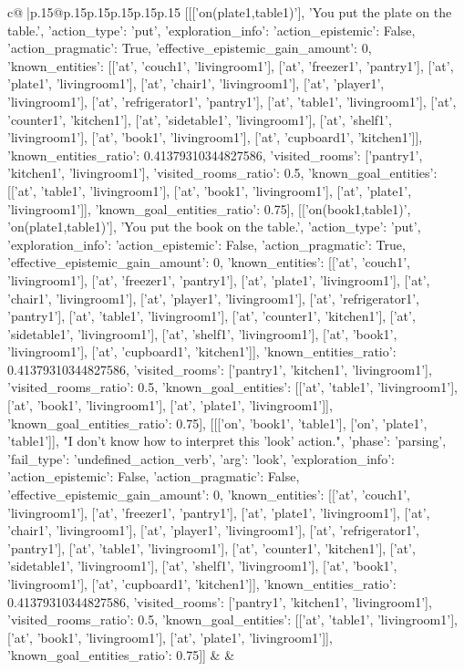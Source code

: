 \documentclass{article}
\begin{document}
{\begin{supertabular}{c@{$\;$}|p{.15\linewidth}@{}p{.15\linewidth}p{.15\linewidth}p{.15\linewidth}p{.15\linewidth}p{.15\linewidth}}
{{{	 [[['on(plate1,table1)'], 'You put the plate on the table.', {'action_type': 'put', 'exploration_info': {'action_epistemic': False, 'action_pragmatic': True, 'effective_epistemic_gain_amount': 0, 'known_entities': [['at', 'couch1', 'livingroom1'], ['at', 'freezer1', 'pantry1'], ['at', 'plate1', 'livingroom1'], ['at', 'chair1', 'livingroom1'], ['at', 'player1', 'livingroom1'], ['at', 'refrigerator1', 'pantry1'], ['at', 'table1', 'livingroom1'], ['at', 'counter1', 'kitchen1'], ['at', 'sidetable1', 'livingroom1'], ['at', 'shelf1', 'livingroom1'], ['at', 'book1', 'livingroom1'], ['at', 'cupboard1', 'kitchen1']], 'known_entities_ratio': 0.41379310344827586, 'visited_rooms': ['pantry1', 'kitchen1', 'livingroom1'], 'visited_rooms_ratio': 0.5, 'known_goal_entities': [['at', 'table1', 'livingroom1'], ['at', 'book1', 'livingroom1'], ['at', 'plate1', 'livingroom1']], 'known_goal_entities_ratio': 0.75}}], [['on(book1,table1)', 'on(plate1,table1)'], 'You put the book on the table.', {'action_type': 'put', 'exploration_info': {'action_epistemic': False, 'action_pragmatic': True, 'effective_epistemic_gain_amount': 0, 'known_entities': [['at', 'couch1', 'livingroom1'], ['at', 'freezer1', 'pantry1'], ['at', 'plate1', 'livingroom1'], ['at', 'chair1', 'livingroom1'], ['at', 'player1', 'livingroom1'], ['at', 'refrigerator1', 'pantry1'], ['at', 'table1', 'livingroom1'], ['at', 'counter1', 'kitchen1'], ['at', 'sidetable1', 'livingroom1'], ['at', 'shelf1', 'livingroom1'], ['at', 'book1', 'livingroom1'], ['at', 'cupboard1', 'kitchen1']], 'known_entities_ratio': 0.41379310344827586, 'visited_rooms': ['pantry1', 'kitchen1', 'livingroom1'], 'visited_rooms_ratio': 0.5, 'known_goal_entities': [['at', 'table1', 'livingroom1'], ['at', 'book1', 'livingroom1'], ['at', 'plate1', 'livingroom1']], 'known_goal_entities_ratio': 0.75}}], [[['on', 'book1', 'table1'], ['on', 'plate1', 'table1']], "I don't know how to interpret this 'look' action.", {'phase': 'parsing', 'fail_type': 'undefined_action_verb', 'arg': 'look', 'exploration_info': {'action_epistemic': False, 'action_pragmatic': False, 'effective_epistemic_gain_amount': 0, 'known_entities': [['at', 'couch1', 'livingroom1'], ['at', 'freezer1', 'pantry1'], ['at', 'plate1', 'livingroom1'], ['at', 'chair1', 'livingroom1'], ['at', 'player1', 'livingroom1'], ['at', 'refrigerator1', 'pantry1'], ['at', 'table1', 'livingroom1'], ['at', 'counter1', 'kitchen1'], ['at', 'sidetable1', 'livingroom1'], ['at', 'shelf1', 'livingroom1'], ['at', 'book1', 'livingroom1'], ['at', 'cupboard1', 'kitchen1']], 'known_entities_ratio': 0.41379310344827586, 'visited_rooms': ['pantry1', 'kitchen1', 'livingroom1'], 'visited_rooms_ratio': 0.5, 'known_goal_entities': [['at', 'table1', 'livingroom1'], ['at', 'book1', 'livingroom1'], ['at', 'plate1', 'livingroom1']], 'known_goal_entities_ratio': 0.75}}]] 
	  } 
	   } 
	   } 
	 & & \\ 
 


\end{supertabular}}
\end{document}
